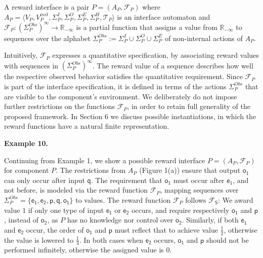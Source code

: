  
A reward interface is a pair $P=(A_{P},\mathcal{F}_{P})$ where $A_{P}=\langle V_{P},V_{P}^{init},\Sigma_{P}^{I},\Sigma_{P}^{O},\Sigma_{P}^{E},\Sigma_{P}^{H},\mathcal{T}_{P}\rangle$ is an interface automaton and $\mathcal{F}_{P}:(\Sigma^{Obs}_{P})^{\infty}\to\mathbb{R}_{-\infty}$ is a partial function that assigns a value from $\mathbb{R}_{-\infty}$ to sequences over the alphabet $\Sigma^{Obs}_{P}:=\Sigma^{I}_{P}\cup\Sigma^{O}_{P}\cup\Sigma^{E}_{P}$ of non-internal actions of $A_{P}$.\par
 
 
 
 
Intuitively, $\mathcal{F}_{P}$ expresses a quantitative specification, by associating reward values with sequences in $(\Sigma^{Obs}_{P})^{\infty}$. The reward value of a sequence describes how well the respective observed behavior satisfies the quantitative requirement. Since $\mathcal{F}_{P}$ is part of the interface specification, it is defined in terms of the actions $\Sigma^{Obs}_{P}$ that are visible to the component’s environment. We deliberately do not impose further restrictions on the functions $\mathcal{F}_{P}$, in order to retain full generality of the proposed framework. In Section 6 we discuss possible instantiations, in which the reward functions have a natural finite representation.\par
 
 
 
\par\medskip\noindent\textbf{Example 10.}\par
 
 
Continuing from Example 1, we show a possible reward interface $P=(A_{P},\mathcal{F}_{P})$ for component $P$. The restrictions from $A_{P}$ (Figure 1(a)) ensure that output $\mathsf{o_{1}}$ can only occur after input $\mathsf{q}$. The requirement that $\mathsf{o_{1}}$ must occur after $\mathsf{e_{1}}$, and not before, is modeled via the reward function $\mathcal{F}_{P}$, mapping sequences over $\Sigma_{P}^{Obs}=\{\mathsf{e_{1}},\mathsf{e_{2}},\mathsf{p},\mathsf{q},\mathsf{o_{1}}\}$ to values. The reward function $\mathcal{F}_{P}$ follows $\mathcal{F}_{\mathsf{S}}$: We award value $1$ if only one type of input $\mathsf{e_{1}}$ or $\mathsf{e_{2}}$ occurs, and require respectively $\mathsf{o_{1}}$ and $\mathsf{p}$, instead of $\mathsf{o_{2}}$, as $P$ has no knowledge nor control over $\mathsf{o_{2}}$. Similarly, if both $\mathsf{e_{1}}$ and $\mathsf{e_{2}}$ occur, the order of $\mathsf{o_{1}}$ and $\mathsf{p}$ must reflect that to achieve value $\frac{1}{2}$, otherwise the value is lowered to $\frac{1}{4}$. In both cases when $\mathsf{e_{2}}$ occurs, $\mathsf{o_{1}}$ and $\mathsf{p}$ should not be performed infinitely, otherwise the assigned value is $0$.\par
 
